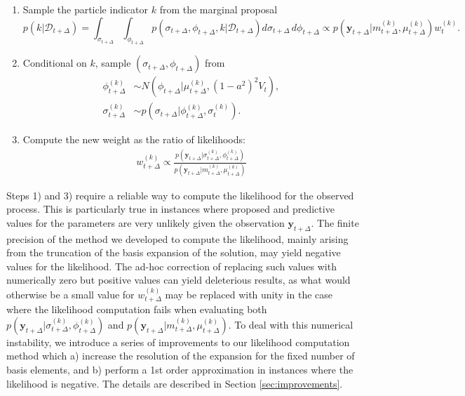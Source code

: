 \documentclass[10pt]{article}
\begin{document}
\begin{enumerate}[1)]
\item Sample the particle indicator $k$ from the marginal proposal
  \[
    p(k| \mathcal{D}_{t+\Delta})= \displaystyle
    \int_{\sigma_{t+\Delta}} \displaystyle \int_{\phi_{t+\Delta}}
    p(\sigma_{t+\Delta}, \phi_{t+\Delta}, k | \mathcal{D}_{t+\Delta})
    d\sigma_{t+\Delta} \,d\phi_{t+\Delta} \propto p(\mathbf{y}_{t+\Delta} | m^{(k)}_{t+\Delta}, \mu^{(k)}_{t+\Delta}) w^{(k)}_t.
  \]
\item Conditional on $k$, sample $(\sigma_{t+\Delta}, \phi_{t+\Delta})$ from
  \begin{align*}
    \phi_{t+\Delta}^{(k)} &\sim N(\phi_{t+\Delta} | \mu_{t+\Delta}^{(k)}, (1-a^2)^2 V_t), \\
    \sigma_{t+\Delta}^{(k)} &\sim p(\sigma_{t+\Delta} | \phi_{t+\Delta}^{(k)}, \sigma_{t}^{(k)}).
  \end{align*}
\item Compute the new weight as the ratio of likelihoods:
  \begin{align*}
    w_{t+\Delta}^{(k)} \propto \frac{p(\mathbf{y}_{t+\Delta} | \sigma^{(k)}_{t+\Delta}, \phi^{(k)}_{t+\Delta})}{p(\mathbf{y}_{t+\Delta} | m^{(k)}_{t+\Delta}, \mu^{(k)}_{t+\Delta})}
  \end{align*}
\end{enumerate}
Steps 1) and 3) require a reliable way to compute the likelihood for
the observed process. This is particularly true in instances where
proposed and predictive values for the parameters are very unlikely
given the observation $\mathbf{y}_{t+\Delta}$. The finite precision of
the method we developed to compute the likelihood, mainly arising from
the truncation of the basis expansion of the solution, may yield
negative values for the likelihood. The ad-hoc correction of replacing
such values with numerically zero but positive values can yield
deleterious results, as what would otherwise be a small value for
$w_{t+\Delta}^{(k)}$ may be replaced with unity in the case where the
likelihood computation fails when evaluating both
$p(\mathbf{y}_{t+\Delta} | \sigma^{(k)}_{t+\Delta},
\phi^{(k)}_{t+\Delta})$ and
$p(\mathbf{y}_{t+\Delta} | m^{(k)}_{t+\Delta},
\mu^{(k)}_{t+\Delta})$. To deal with this numerical instability, we
introduce a series of improvements to our likelihood computation
method which a) increase the resolution of the expansion for the fixed
number of basis elements, and b) perform a 1st order approximation in
instances where the likelihood is negative. The details are described
in Section \ref{sec:improvements}.
\end{document}
